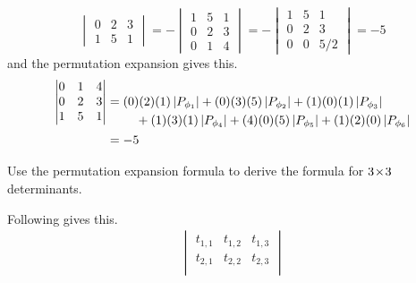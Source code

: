 \begin{exercises}
\begin{answer}
\begin{exparts}
\begin{equation*}
\begin{vmatrix}
              0  &2  &3  \\
              1  &5  &1
            \end{vmatrix}
            =
            -\begin{vmatrix}
              1  &5  &1  \\
              0  &2  &3  \\
              0  &1  &4  
            \end{vmatrix}
            =
            -\begin{vmatrix}
              1  &5  &1  \\
              0  &2  &3  \\
              0  &0  &5/2  
            \end{vmatrix}
            =-5
          \end{equation*}
          and the permutation expansion gives this.
          \begin{align*}
            \begin{vmatrix}
              0  &1  &4  \\
              0  &2  &3  \\
              1  &5  &1
            \end{vmatrix}
            &=
            \begin{aligned}[t]
            &(0)(2)(1)\deter{P_{\phi_1}}
            +(0)(3)(5)\deter{P_{\phi_2}}
            +(1)(0)(1)\deter{P_{\phi_3}}  \\
            &\hbox{}\quad\hbox{}
            +(1)(3)(1)\deter{P_{\phi_4}}
            +(4)(0)(5)\deter{P_{\phi_5}}
            +(1)(2)(0)\deter{P_{\phi_6}}
            \end{aligned}                         \\
            &=-5
          \end{align*}
      \end{exparts}  
    \end{answer}
  \recommended \item 
    Use the permutation expansion formula to derive
    the formula for \( 3 \! \times \! 3 \) determinants.
    \begin{answer}
        Following  gives this.
          \begin{align*}
             \begin{vmatrix}
                t_{1,1}  &t_{1,2}  &t_{1,3}  \\
                t_{2,1}  &t_{2,2}  &t_{2,3}  \\

\end{vmatrix}
\end{align*}
\end{answer}
\end{exercises}

